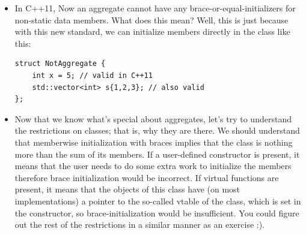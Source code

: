 \documentclass[a4paper,11pt,twoside]{book}
\begin{document}
\begin{itemize}
	\item In C++11, Now an aggregate cannot have any brace-or-equal-initializers for non-static data members. What does this mean? Well, this is just because with this new standard, we can initialize members directly in the class like this:
\begin{lstlisting}[numbers=none]
struct NotAggregate {
	int x = 5; // valid in C++11
	std::vector<int> s{1,2,3}; // also valid
};
\end{lstlisting}

	\item Now that we know what's special about aggregates, let's try to understand the restrictions on classes; that is, why they are there. We should understand that memberwise initialization with braces implies that the class is nothing more than the sum of its members. If a user-defined constructor is present, it means that the user needs to do some extra work to initialize the members therefore brace initialization would be incorrect. If virtual functions are present, it means that the objects of this class have (on most implementations) a pointer to the so-called vtable of the class, which is set in the constructor, so brace-initialization would be insufficient. You could figure out the rest of the restrictions in a similar manner as an exercise :).
	
\end{itemize}
\end{document}
